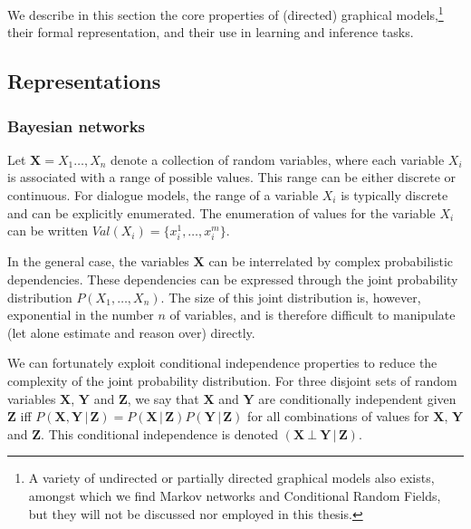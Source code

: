 We describe in this section the core properties of (directed) graphical models,\footnote{A variety of undirected or partially directed graphical models also exists, amongst which we find Markov networks and Conditional Random Fields, but they will not be discussed nor employed in this thesis.} their formal representation, and their use in learning and inference tasks. 
 
 \subsection{Representations}
 \label{sec:gm-representation}
\subsubsection*{Bayesian networks}

Let $\mathbf{X} = X_1 \dots, X_n$ denote a collection of random variables, where each variable $X_i$ is associated with a range of possible values.  This range can be either discrete or continuous.  For dialogue models, the range of a variable $X_i$ is typically discrete and can be explicitly enumerated. The enumeration of values for the variable $X_i$ can be written $\mathit{Val}(X_i) = \{x_i^1, \dots, x_i^m\}$.  

In the general case, the variables $\mathbf{X}$ can be interrelated by complex probabilistic dependencies.  These dependencies can be expressed through the joint probability distribution $P(X_1, \dots, X_n)$.  The size of this joint distribution is, however,  exponential in the number $n$ of variables, and is therefore difficult to manipulate (let alone estimate and reason over) directly. 

We can fortunately exploit conditional independence properties to reduce the complexity of the joint probability distribution.  For three disjoint sets of random variables $\mathbf{X}$, $\mathbf{Y}$ and $\mathbf{Z}$, we say that $\mathbf{X}$ and $\mathbf{Y}$ are conditionally independent given $\mathbf{Z}$ iff $P(\mathbf{X},\mathbf{Y} \, | \, \mathbf{Z}) = P(\mathbf{X} \, | \, \mathbf{Z}) P(\mathbf{Y} \, | \, \mathbf{Z})$ for all combinations of values for  $\mathbf{X}$, $\mathbf{Y}$ and  $\mathbf{Z}$. This conditional independence is denoted $(\mathbf{X} \ \bot \  \mathbf{Y} \, | \,  \mathbf{Z})$. 

